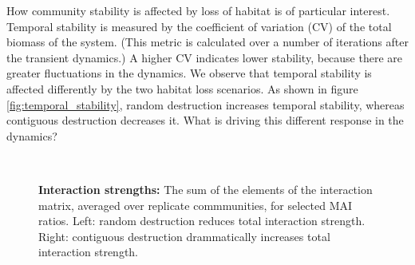How community stability is affected by loss of habitat is of particular interest. Temporal stability is measured by the coefficient of variation (CV) of the total biomass of the system. (This metric is calculated over a number of iterations after the transient dynamics.) A higher CV indicates lower stability, because there are greater fluctuations in the dynamics. We observe that temporal stability is affected differently by the two habitat loss scenarios. As shown in figure \ref{fig:temporal_stability}, random destruction increases temporal stability, whereas contiguous destruction decreases it. What is driving this different response in the dynamics?    

\begin{figure} 
		\centering      
        ~
        \caption{\textbf{Interaction strengths:} The sum of the elements of the interaction matrix, averaged over replicate commmunities, for selected MAI ratios. Left: random destruction reduces total interaction strength. Right: contiguous destruction drammatically increases total interaction strength.}\label{fig:IS3}
\end{figure}

